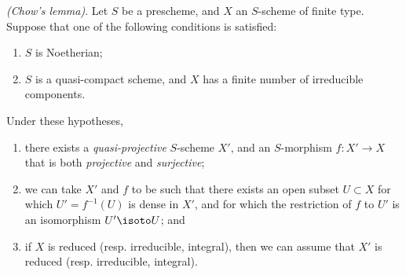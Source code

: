\begin{theorem}[5.6.1]
\label{II.5.6.1}
\emph{(Chow's lemma)}.
Let $S$ be a prescheme, and $X$ an $S$-scheme of finite type.
Suppose that one of the following conditions is satisfied:
\begin{enumerate}
  \item[{\rm(a)}] $S$ is Noetherian;
  \item[{\rm(b)}] $S$ is a quasi-compact scheme, and $X$ has a finite number of irreducible components.
\end{enumerate}
Under these hypotheses,
\begin{enumerate}
  \item[{\rm(i)}] there exists a \emph{quasi-projective} $S$-scheme $X'$, and an $S$-morphism $f:X'\to X$ that is both \emph{projective} and \emph{surjective};
  \item[{\rm(ii)}] we can take $X'$ and $f$ to be such that there exists an open subset $U\subset X$ for which $U'=f^{-1}(U)$ is dense in $X'$, and for which the restriction of $f$ to $U'$ is an isomorphism $U'\isoto U$; and
  \item[{\rm(iii)}] if $X$ is reduced (resp. irreducible, integral), then we can assume that $X'$ is reduced (resp. irreducible, integral).
\end{enumerate}
\end{theorem}

